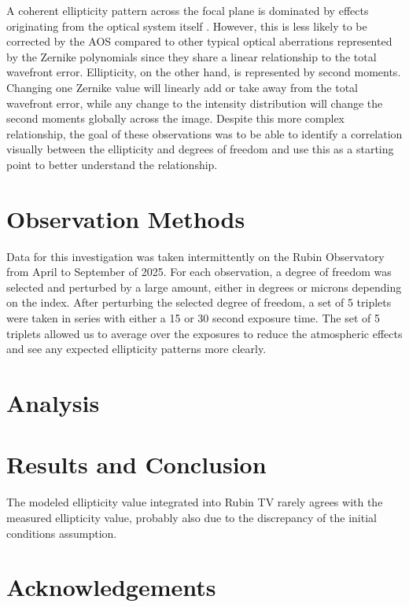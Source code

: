 \documentclass[SE,lsstdraft,authoryear,toc]{lsstdoc}
\begin{document}
A coherent ellipticity pattern across the focal plane is dominated by effects originating from the optical system itself \cite{Jarvis2008}. However, this is less likely to be corrected by the AOS compared to other typical optical aberrations represented by the Zernike polynomials since they share a linear relationship to the total wavefront error. Ellipticity, on the other hand, is represented by second moments. Changing one Zernike value will linearly add or take away from the total wavefront error, while any change to the intensity distribution will change the second moments globally across the image. Despite this more complex relationship, the goal of these observations was to be able to identify a correlation visually between the ellipticity and degrees of freedom and use this as a starting point to better understand the relationship.  

\section{Observation Methods}

Data for this investigation was taken intermittently on the Rubin Observatory from April to September of 2025.
For each observation, a degree of freedom was selected and perturbed by a large amount, either in degrees or microns depending on the index.
After perturbing the selected degree of freedom, a set of 5 triplets were taken in series with either a 15 or 30 second exposure time. 
The set of 5 triplets allowed us to average over the exposures to reduce the atmospheric effects and see any expected ellipticity patterns more clearly. 

\section{Analysis}

\section{Results and Conclusion}

The modeled ellipticity value integrated into Rubin TV rarely agrees with the measured ellipticity value, probably also due to the discrepancy of the initial conditions assumption. 


\clearpage

\appendix

\section{Acknowledgements}
\end{document}
